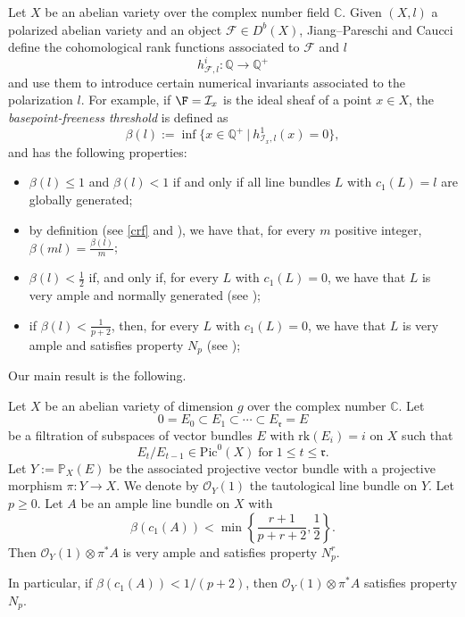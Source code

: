 \documentclass[11pt,letter]{amsart}
\numberwithin{equation}{section}
\begin{document}
Let $X$ be an abelian variety over the complex number field $\mathbb{C}$. 
Given $(X,l)$ a polarized abelian variety and an object $\mathcal{F}\in D^b(X)$, Jiang--Pareschi \cite{JiPa2020} and Caucci \cite{Caucci} define the {cohomological rank functions} associated to $\mathcal{F}$ and $l$
\[
h^i_{\mathcal{F},l}:\mathbb{Q}\rightarrow\mathbb{Q}^+
\]
and use them to introduce certain numerical invariants associated to the polarization $l$. For example, if $\mathcal{\F}=\mathcal{I}_x$ is the ideal sheaf of a point $x\in X$, the \emph{basepoint-freeness threshold} is defined as
\[\beta(l):=\inf\{x\in\mathbb{{Q}}^+\:|\:h^1_{\mathcal{I}_x,l}(x)=0\},\] 
and has the following properties:
\begin{itemize}
    \item $\beta(l)\leq 1$ and $\beta(l)<1$ if and only if all line bundles $L$ with $c_1(L)=l$ are globally generated;
    \item by definition (see \ref{crf} and \cite[Proof of Cor. 1.2]{Caucci}), we have that, for every $m$ positive integer, $\beta(ml)=\frac{\beta(l)}{m}$;
    \item $\beta(l)<\frac{1}{2}$ if, and only if, for every $L$ with $c_1(L)=0$, we have that $L$ is very ample and normally generated (see \cite[Cor. E]{JiPa2020});
    \item if $\beta(l)<\frac{1}{p+2}$, then, for every $L$ with $c_1(L)=0$, we have that $L$ is very ample and satisfies property $N_p$ (see \cite[Thm. 1.1]{Caucci});
\end{itemize}
 Our main result is the following.
\begin{introthm}\label{TheoremA}
Let $X$ be an abelian variety of dimension $g$ over the complex number $\mathbb{C}$. Let 
\[
0=E_0\subset E_1\subset \cdots \subset E_\mathfrak{r}=E
\]
be a filtration of subspaces of vector bundles $E$ with $\mathrm{rk}(E_i)=i$ on $X$ such that
\[
E_t/E_{t-1}\in\mathrm{Pic}^0(X)\;\text{for}\;1\leq t\leq\mathfrak{r}.
\] 
Let $Y:=\mathbb{P}_X(E)$ be the associated projective vector bundle with a projective morphism $\pi:Y\rightarrow X$. We denote by $\mathcal{O}_Y(1)$ the tautological line bundle on $Y$. Let $p\geq 0$. Let $A$ be an ample line bundle on $X$ with 
\[\beta(c_1(A))<\min\left\{\frac{r+1}{p+r+2},\frac{1}{2}\right\}.\] Then $\mathcal{O}_Y(1)\otimes\pi^* A$ is very ample and satisfies property $N_p^r$.

In particular, if $\beta(c_1(A))<1/(p+2)$, then $\mathcal{O}_Y(1)\otimes\pi^* A$ satisfies property $N_p$.

\end{introthm}
\end{document}
